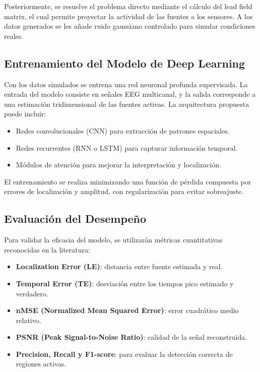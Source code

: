    Posteriormente, se resuelve el problema directo mediante el cálculo del lead field matrix, el cual permite proyectar la actividad de las fuentes a los sensores. A los datos generados se les añade ruido gaussiano controlado para simular condiciones reales.

    \subsection{Entrenamiento del Modelo de Deep Learning}

    Con los datos simulados se entrena una red neuronal profunda supervisada. La entrada del modelo consiste en señales EEG multicanal, y la salida corresponde a una estimación tridimensional de las fuentes activas. La arquitectura propuesta puede incluir:

    \begin{itemize}
        \item Redes convolucionales (CNN) para extracción de patrones espaciales.
        \item Redes recurrentes (RNN o LSTM) para capturar información temporal.
        \item Módulos de atención para mejorar la interpretación y localización.
    \end{itemize}

    El entrenamiento se realiza minimizando una función de pérdida compuesta por errores de localización y amplitud, con regularización para evitar sobreajuste.

    \subsection{Evaluación del Desempeño}

    Para validar la eficacia del modelo, se utilizarán métricas cuantitativas reconocidas en la literatura:

    \begin{itemize}
        \item \textbf{Localization Error (LE)}: distancia entre fuente estimada y real.
        \item \textbf{Temporal Error (TE)}: desviación entre los tiempos pico estimado y verdadero.
        \item \textbf{nMSE (Normalized Mean Squared Error)}: error cuadrático medio relativo.
        \item \textbf{PSNR (Peak Signal-to-Noise Ratio)}: calidad de la señal reconstruida.
        \item \textbf{Precision, Recall y F1-score}: para evaluar la detección correcta de regiones activas.
    \end{itemize}
    
